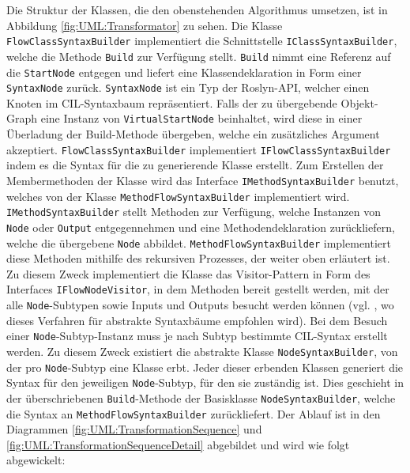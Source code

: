 \newline
Die Struktur der Klassen, die den obenstehenden Algorithmus umsetzen, ist in Abbildung \ref{fig:UML:Transformator} zu sehen. Die Klasse \texttt{FlowClassSyntaxBuilder} implementiert die Schnittstelle \texttt{IClassSyntaxBuilder}, welche die Methode \texttt{Build} zur Verfügung stellt. \texttt{Build} nimmt eine Referenz auf die \texttt{StartNode} entgegen und liefert eine Klassendeklaration in Form einer \texttt{SyntaxNode} zurück. \texttt{SyntaxNode} ist ein Typ der Roslyn-API, welcher einen Knoten im CIL-Syntaxbaum repräsentiert. Falls der zu übergebende Objekt-Graph eine Instanz von \texttt{VirtualStartNode} beinhaltet, wird diese in einer Überladung der Build-Methode übergeben, welche ein zusätzliches Argument akzeptiert. \texttt{FlowClassSyntaxBuilder} implementiert \texttt{IFlowClassSyntaxBuilder} indem es die Syntax für die zu generierende Klasse erstellt. Zum Erstellen der Membermethoden der Klasse wird das Interface \texttt{IMethodSyntaxBuilder} benutzt, welches von der Klasse \texttt{Meth\-od\-Flow\-Syn\-tax\-Buil\-der} implementiert wird. \texttt{IMe\-thod\-Syn\-tax\-Buil\-der} stellt Methoden zur Verfügung, welche Instanzen von \texttt{Node} oder \texttt{Output} entgegennehmen und eine Methodendeklaration zurückliefern, welche die übergebene \texttt{Node} abbildet. \texttt{Meth\-od\-Flow\-Syn\-tax\-Buil\-der} implementiert diese Methoden mithilfe des rekursiven Prozesses, der weiter oben erläutert ist. Zu diesem Zweck implementiert die Klasse das Visitor-Pattern in Form des Interfaces \texttt{IFlowNodeVisitor}, in dem Methoden bereit gestellt werden, mit der alle \texttt{Node}-Subtypen sowie Inputs und Outputs besucht werden können (vgl. \cite[S. 5f]{Jones}, wo dieses Verfahren für abstrakte Syntaxbäume empfohlen wird). Bei dem Besuch einer \texttt{Node}-Subtyp-Instanz muss je nach Subtyp bestimmte CIL-Syntax erstellt werden. Zu diesem Zweck existiert die abstrakte Klasse \texttt{NodeSyntaxBuilder}, von der pro \texttt{Node}-Subtyp eine Klasse erbt. Jeder dieser erbenden Klassen generiert die Syntax für den jeweiligen \texttt{Node}-Subtyp, für den sie zuständig ist. Dies geschieht in der überschriebenen \texttt{Build}-Methode der Basisklasse \texttt{NodeSyntaxBuilder}, welche die Syntax an \texttt{MethodFlowSyntaxBuilder} zurückliefert. Der Ablauf ist in den Diagrammen \ref{fig:UML:TransformationSequence} und \ref{fig:UML:TransformationSequenceDetail} abgebildet und wird wie folgt abgewickelt:

